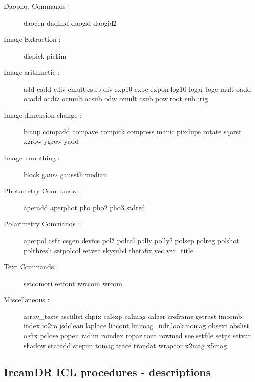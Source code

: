 \begin{description}
\item[Daophot Commands :] daocen daofind daogid daogid2

\item[Image Extraction :] dispick pickim

\item[Image arithmetic :] add cadd cdiv cmult csub div exp10 expe expon log10
logar loge mult oadd ocadd ocdiv ocmult ocsub odiv omult osub pow root
sub trig

\item[Image dimension change :] binup compadd compave compick compress manic
pixdupe rotate sqorst xgrow ygrow yadd

\item[Image smoothing :] block gauss gaussth median
\item[Photometry Commands :] aperadd aperphot pho pho2 pho3 stdred

\item[Polarimetry Commands :] aperpol csfit csgen devfcs pol2 polcal polly
polly2 polsep polreg polshot polthresh setpolcol setvec skysub4 thetafix
vec vec\_title

\item[Text Commands :] setcomori setfont wrccom wrcom

\item[Miscellaneous :] array\_tests asciilist chpix calexp calmag calzer creframe
getrast imcomb index io2ro jsdclean laplace lincont linimag\_ndr look
nomag obsext obslist oefix pclose popen radim roindex ropar rout rowmed
see setfile setps setvar shadow stcoadd stepim tomag trace trandat
wrapcor x2mag x5mag

\end{description}

\subsection{IrcamDR ICL procedures - descriptions}

